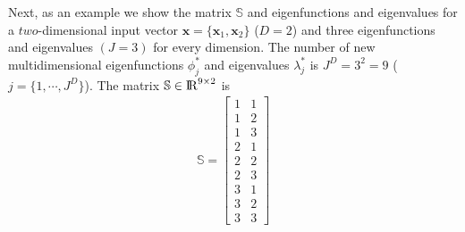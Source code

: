\documentclass[]{interact}
\theoremstyle{plain}%
\theoremstyle{definition}
\theoremstyle{remark}
\begin{document}
Next, as an example we show the matrix $\mathbb{S}$ and eigenfunctions and eigenvalues for a $two$-dimensional input vector $\bm{x}=\{\bm{x}_1,\bm{x}_2\}$ ($D=2$) and three eigenfunctions and eigenvalues $(J=3)$ for every dimension. The number of new multidimensional eigenfunctions $\phi^{\ast}_j$ and eigenvalues $\lambda^{\ast}_j$ is $J^D=3^2=9$ ($j=\{1,\cdots,J^D\}$). The matrix $\mathbb{S}\in {\rm I\!R}^{9 \times 2}$ is
%
\begin{eqnarray}
\mathbb{S}=
\left[ {\begin{array}{cc}
1 & 1 \nonumber \\
1 & 2 \\
1 & 3 \\
2 & 1 \\
2 & 2 \\
2 & 3 \\
3 & 1 \\
3 & 2 \\
3 & 3
\end{array} } \right]
\end{eqnarray} 
\end{document}
